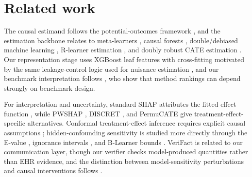 \documentclass{article}
\begin{document}
\section{Related work}
The causal estimand follows the potential-outcomes framework \citep{imbens2015}, and the estimation backbone relates to meta-learners \citep{kunzel2019}, causal forests \citep{wager2018}, double/debiased machine learning \citep{chernozhukov2018}, R-learner estimation \citep{nie2021}, and doubly robust CATE estimation \citep{kennedy2023}. Our representation stage uses XGBoost leaf features \citep{chen2016} with cross-fitting motivated by the same leakage-control logic used for nuisance estimation \citep{chernozhukov2018}, and our benchmark interpretation follows \citet{curth2021}, who show that method rankings can depend strongly on benchmark design.

For interpretation and uncertainty, standard SHAP attributes the fitted effect function \citep{lundberg2017}, while PWSHAP \citep{terminassian2023}, DISCRET \citep{wu2024}, and PermuCATE \citep{paillard2025} give treatment-effect-specific alternatives. Conformal treatment-effect inference requires explicit causal assumptions \citep{lei2020}; hidden-confounding sensitivity is studied more directly through the E-value \citep{vanderweele2017}, ignorance intervals \citep{jesson2021}, and B-Learner bounds \citep{oprescu2023}. VeriFact \citep{chung2025} is related to our communication layer, though our verifier checks model-produced quantities rather than EHR evidence, and the distinction between model-sensitivity perturbations and causal interventions follows \citet{pearl2009}.
\end{document}
